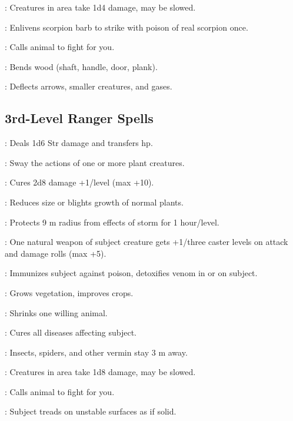 : Creatures in area take 1d4 damage, may be slowed.

: Enlivens scorpion barb to strike with poison of real scorpion once. %

: Calls animal to fight for you.

: Bends wood (shaft, handle, door, plank).

: Deflects arrows, smaller creatures, and gases.



\subsection{3rd-Level Ranger Spells}


: Deals 1d6 Str damage and transfers hp. %

: Sway the actions of one or more plant creatures.

: Cures 2d8 damage +1/level (max +10).

: Reduces size or blights growth of normal plants.

: Protects 9 m radius from effects of storm for 1 hour/level. %

: One natural weapon of subject creature gets +1/three caster levels on attack and damage rolls (max +5).

: Immunizes subject against poison, detoxifies venom in or on subject.

: Grows vegetation, improves crops.

: Shrinks one willing animal.

: Cures all diseases affecting subject.

: Insects, spiders, and other vermin stay 3 m away.

: Creatures in area take 1d8 damage, may be slowed.

: Calls animal to fight for you.

: Subject treads on unstable surfaces as if solid. %

